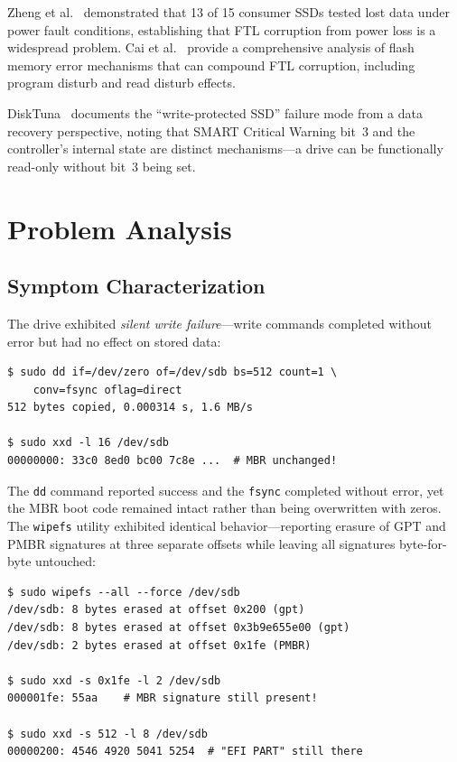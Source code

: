 \documentclass[conference]{IEEEtran}
\begin{document}
Zheng et al.~\cite{zheng2013understanding} demonstrated that 13 of 15
consumer SSDs tested lost data under power fault conditions, establishing
that FTL corruption from power loss is a widespread problem.
Cai et al.~\cite{cai2017errors} provide a comprehensive analysis of
flash memory error mechanisms that can compound FTL corruption,
including program disturb and read disturb effects.

DiskTuna~\cite{disktuna-wp} documents the ``write-protected SSD''
failure mode from a data recovery perspective, noting that SMART
Critical Warning bit~3 and the controller's internal state are distinct
mechanisms---a drive can be functionally read-only without bit~3 being
set.


\section{Problem Analysis}
\label{sec:problem}

\subsection{Symptom Characterization}
\label{sec:symptoms}

The drive exhibited \emph{silent write failure}---write commands
completed without error but had no effect on stored data:

\begin{lstlisting}[style=shell,caption={Silent write failure: dd reports
success but data is unchanged.},label={lst:silent-write}]
$ sudo dd if=/dev/zero of=/dev/sdb bs=512 count=1 \
    conv=fsync oflag=direct
512 bytes copied, 0.000314 s, 1.6 MB/s

$ sudo xxd -l 16 /dev/sdb
00000000: 33c0 8ed0 bc00 7c8e ...  # MBR unchanged!
\end{lstlisting}

The \texttt{dd} command reported success and the \texttt{fsync} completed
without error, yet the MBR boot code remained intact rather than being
overwritten with zeros. The \texttt{wipefs} utility exhibited identical
behavior---reporting erasure of GPT and PMBR signatures at three
separate offsets while leaving all signatures byte-for-byte
untouched:

\begin{lstlisting}[style=shell,caption={wipefs reports success but
signatures remain intact.},label={lst:wipefs}]
$ sudo wipefs --all --force /dev/sdb
/dev/sdb: 8 bytes erased at offset 0x200 (gpt)
/dev/sdb: 8 bytes erased at offset 0x3b9e655e00 (gpt)
/dev/sdb: 2 bytes erased at offset 0x1fe (PMBR)

$ sudo xxd -s 0x1fe -l 2 /dev/sdb
000001fe: 55aa    # MBR signature still present!

$ sudo xxd -s 512 -l 8 /dev/sdb
00000200: 4546 4920 5041 5254  # "EFI PART" still there
\end{lstlisting}
\end{document}
